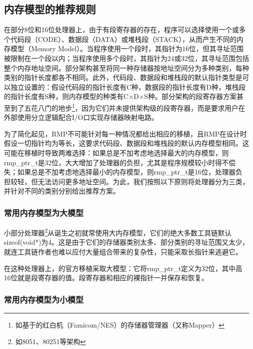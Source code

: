 \subsection{内存模型的推荐规则}\label{subsec:recommended-rules-for-memory-models}

在部分8位和16位处理器上，由于有段寄存器的存在，程序可以选择使用一个或多个代码段（CODE）、数据段（DATA）或堆栈段（STACK），从而产生不同的内存模型（Memory
Model）。当程序使用一个段时，其指针为16位，但其寻址范围被限制在一个段以内；当程序使用多个段时，其指针为24或32位，其寻址范围包括整个内存地址空间。部分架构甚至将同一种存储器按地址空间分为多种类别，每种类别的指针长度都各不相同。此外，代码段、数据段和堆栈段的默认指针类型是可以独立设置的：假设代码段的指针长度有C种，数据段的指针长度有D种，堆栈段的指针长度有S种，则内存模型的种类有C×D×S种。部分架构的段寄存器方案甚至到了五花八门的地步\footnote{如基于的红白机（Famicom/NES）的存储器管理器（又称Mapper）}，因为它们并未提供架构级的段寄存器，而是要求用户在外部使用分立逻辑配合I/O口实现存储器映射电路。

为了简化起见，RMP不可能针对每一种情况都给出相应的移植，且RMP在设计时假设一切指针均为等长，这要求代码段、数据段和堆栈段的默认内存模型相同。这可能在移植时导致两难选择：如果总是不加考虑地选择最大的内存模型，则rmp\_ptr\_t是32位，大大增加了处理器的负担，尤其是程序规模较小时得不偿失；如果总是不加考虑地选择最小的内存模型，则rmp\_ptr\_t是16位，处理器负担较轻，但无法访问更多地址空间。为此，我们按照以下原则将处理器分为三类，并针对不同的类别分别给出推荐方案。

\subsubsection{常用内存模型为大模型}\label{subsubsec:the-common-memory-model-is-the-large-model}

小部分处理器\footnote{如8051、80251等架构}从诞生之初就常使用大内存模型，它们的绝大多数工具链默认sizeof(void*)为4。这是由于它们的存储器类别太多、部分类别的寻址范围又太少，就连工具链作者也难以应付大量组合带来的复杂性，只能采取长指针来逃避它。

在这种处理器上，的官方移植采取大模型：它将rmp\_ptr\_t定义为32位，其中高16位就是段寄存器的值。段寄存器和相应的裸指针一并保存和恢复。

\subsubsection{常用内存模型为小模型}\label{subsubsec:the-common-memory-model-is-the-small-model}

